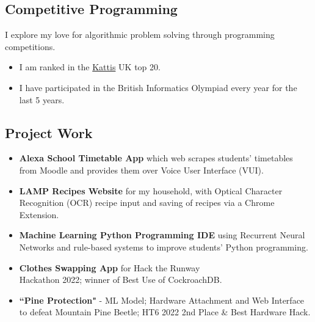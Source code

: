 \documentclass{Resume2}
\begin{document}
		\subsection{Competitive Programming}
			I explore my love for algorithmic problem solving through programming competitions. 
			\begin{itemize}
			    \item I am ranked in the \href{https://open.kattis.com/countries/GBR}{Kattis} UK top 20.
			    \item I have participated in the British Informatics Olympiad every year for the last 5 years.
			    
			\end{itemize}
		\subsection{Project Work}
			\begin{itemize}[itemsep=1mm, parsep=0pt]
				\item \textbf{Alexa School Timetable App} which web scrapes students' timetables from Moodle and provides them over Voice User Interface (VUI).
				\item \textbf{LAMP Recipes Website} for my household, with Optical Character Recognition (OCR) recipe input and saving of recipes via a Chrome Extension.
				\item \textbf{Machine Learning Python Programming IDE} using Recurrent Neural Networks and rule-based systems to improve students' Python programming. %
				\item \textbf{Clothes Swapping App} for Hack the Runway \\ Hackathon 2022; winner of Best Use of CockroachDB.
				\item \textbf{``Pine Protection"} - ML Model; Hardware Attachment and Web Interface to defeat Mountain Pine Beetle; HT6 2022 2nd Place \& Best Hardware Hack.
			\end{itemize}
\end{document}
